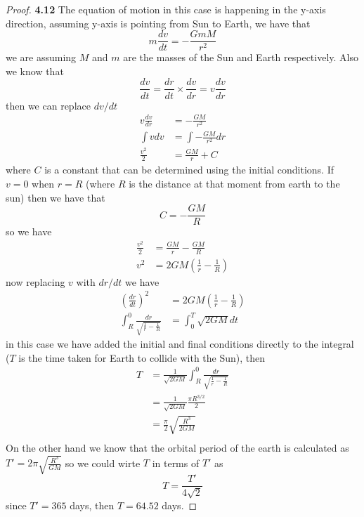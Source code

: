 \documentclass[11pt]{article}
\theoremstyle{definition}
\begin{document}
    \begin{proof}{\textbf{4.12}}
        The equation of motion in this case is happening in the y-axis
        direction, assuming y-axis is pointing from Sun to Earth, we have that
        $$m\frac{dv}{dt} = - \frac{GmM}{r^2}$$
        we are assuming $M$ and $m$ are the masses of the Sun and Earth
        respectively. Also we know that
        $$\frac{dv}{dt} = \frac{dr}{dt}\times\frac{dv}{dr} = v\frac{dv}{dr}$$
        then we can replace $dv/dt$
        \begin{align*}
            v\frac{dv}{dr} &= - \frac{GM}{r^2}\\
            \int vdv &= \int - \frac{GM}{r^2} dr\\
            \frac{v^2}{2} &= \frac{GM}{r} + C
        \end{align*}
        where $C$ is a constant that can be determined using the initial
        conditions. If $v = 0$ when $r = R$ (where $R$ is the distance at that
        moment from earth to the sun) then we have that
        $$C = - \frac{GM}{R}$$
        so we have
        \begin{align*}
            \frac{v^2}{2} &= \frac{GM}{r} - \frac{GM}{R}\\
            v^2 &= 2GM\left(\frac{1}{r} - \frac{1}{R}\right)
        \end{align*}
        now replacing $v$ with $dr/dt$ we have
        \begin{align*}
            \left(\frac{dr}{dt}\right)^2
                &= 2GM\left(\frac{1}{r} - \frac{1}{R}\right)\\
            \int_R^0 \frac{dr}{\sqrt{\frac{1}{r} - \frac{1}{R}}}
                &= \int_0^T\sqrt{2GM}dt
        \end{align*}
        in this case we have added the initial and final conditions directly to
        the integral ($T$ is the time taken for Earth to collide with the Sun),
        then
        \begin{align*}
            T &= \frac{1}{\sqrt{2GM}}\int_R^0 \frac{dr}{\sqrt{\frac{1}{r} - \frac{1}{R}}}\\
              &= \frac{1}{\sqrt{2GM}}\frac{\pi R^{3/2}}{2}\\
              &= \frac{\pi}{2}\sqrt{\frac{R^3}{2GM}}\\
        \end{align*}
        On the other hand we know that the orbital period of the earth is
        calculated as $T' = 2\pi \sqrt{\frac{R^3}{GM}}$ so we could wirte $T$
        in terms of $T'$ as
        $$T = \frac{T'}{4\sqrt{2}}$$
        since $T' = 365$ days, then $T = 64.52$ days.
    \end{proof}
\end{document}
